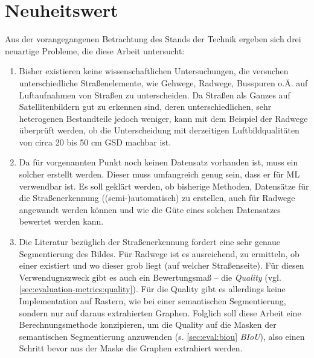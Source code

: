 \section{Neuheitswert} \label{sec:novelty}

Aus der vorangegangenen Betrachtung des Stands der Technik ergeben sich drei neuartige Probleme, die 
diese Arbeit untersucht:
\begin{enumerate}
	\item Bisher existieren keine wissenschaftlichen Untersuchungen, die versuchen unterschiedliche Straßenelemente,
	wie Gehwege, Radwege, Busspuren o.Ä. auf Luftaufnahmen von Straßen zu unterscheiden. Da Straßen als Ganzes 
	auf Satellitenbildern gut zu erkennen sind, deren unterschiedlichen, sehr heterogenen Bestandteile jedoch weniger, 
	kann mit dem Beispiel der Radwege überprüft werden, ob die Unterscheidung mit derzeitigen Luftbildqualitäten von circa 20 bis 50 cm \ac{GSD} 
	machbar ist. 
	\item Da für vorgenannten Punkt noch keinen Datensatz vorhanden ist, muss ein solcher erstellt werden. Dieser muss umfangreich 
	genug sein, dass er für \ac{ML} verwendbar ist. Es soll geklärt werden, ob bisherige Methoden, Datensätze für die Straßenerkennung 
	((semi-)automatisch) zu erstellen, auch für Radwege angewandt werden können und wie die Güte eines solchen Datensatzes bewertet werden kann. 
	\item Die Literatur bezüglich der Straßenerkennung fordert eine sehr genaue Segmentierung des Bildes. Für Radwege ist es ausreichend, 
	zu ermitteln, ob einer existiert und wo dieser grob liegt (auf welcher Straßenseite). Für diesen Verwendugnszweck gibt 
	es auch ein Bewertungsmaß -- die \textit{Quality} (vgl. \autoref{sec:evaluation-metrics:quality}). Für die Quality gibt es allerdings
	keine Implementation auf Rastern, wie bei einer semantischen Segmentierung, sondern nur auf daraus extrahierten Graphen. 
	Folglich soll diese Arbeit eine Berechnungsmethode konzipieren, um die Quality auf die Masken der semantischen Segmentierung anzuwenden 
	(s. \autoref{sec:eval:biou} \textit{BIoU}), also einen Schritt bevor aus der Maske die Graphen extrahiert werden.     
\end{enumerate} 